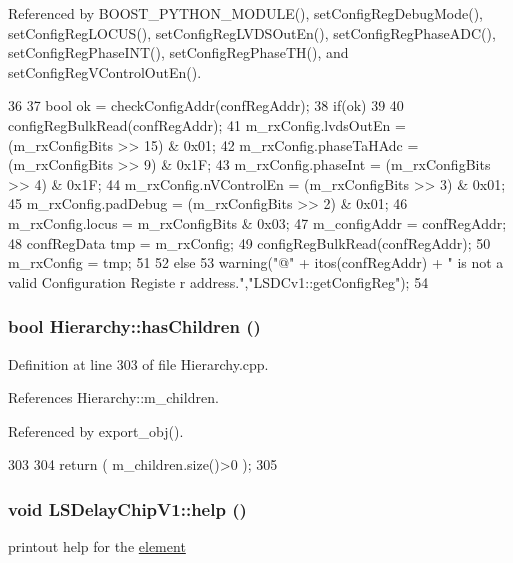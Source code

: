 Referenced by BOOST\_\-PYTHON\_\-MODULE(), setConfigRegDebugMode(), setConfigRegLOCUS(), setConfigRegLVDSOutEn(), setConfigRegPhaseADC(), setConfigRegPhaseINT(), setConfigRegPhaseTH(), and setConfigRegVControlOutEn().


\begin{DoxyCode}
36 {
37     bool ok = checkConfigAddr(confRegAddr);
38     if(ok)
39     {
40         configRegBulkRead(confRegAddr);
41         m_rxConfig.lvdsOutEn    = (m_rxConfigBits >> 15) & 0x01;
42         m_rxConfig.phaseTaHAdc  = (m_rxConfigBits >> 9)  & 0x1F;
43         m_rxConfig.phaseInt     = (m_rxConfigBits >> 4)  & 0x1F;
44         m_rxConfig.nVControlEn  = (m_rxConfigBits >> 3)  & 0x01;
45         m_rxConfig.padDebug     = (m_rxConfigBits >> 2)  & 0x01;
46         m_rxConfig.locus        =  m_rxConfigBits        & 0x03;
47         m_configAddr            =  confRegAddr;
48 confRegData tmp = m_rxConfig;       
49 configRegBulkRead(confRegAddr);
50 m_rxConfig = tmp;       
51      }
52      else
53          warning("@" + itos(confRegAddr) + " is not a valid Configuration Registe
      r address.","LSDCv1::getConfigReg");    
54 }
\end{DoxyCode}
\hypertarget{classHierarchy_a255174fe4d316d2a3f430dcb9dab29f1}{
\subsubsection[{hasChildren}]{\setlength{\rightskip}{0pt plus 5cm}bool Hierarchy::hasChildren ()}}
\label{classHierarchy_a255174fe4d316d2a3f430dcb9dab29f1}


Definition at line 303 of file Hierarchy.cpp.

References Hierarchy::m\_\-children.

Referenced by export\_\-obj().


\begin{DoxyCode}
303                               {
304   return ( m_children.size()>0 );
305 }
\end{DoxyCode}
\hypertarget{classLSDelayChipV1_a3d57457a70f7d42687197704321b0c8e}{
\subsubsection[{help}]{\setlength{\rightskip}{0pt plus 5cm}void LSDelayChipV1::help ()}}
\label{classLSDelayChipV1_a3d57457a70f7d42687197704321b0c8e}
printout help for the \hyperlink{namespaceelement}{element} 

